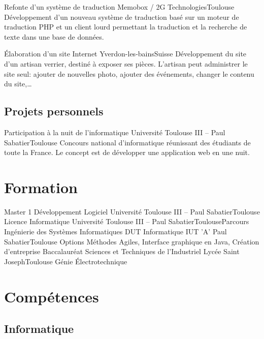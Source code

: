 \documentclass{my_cv_bis}
\begin{document}
	{ Refonte d’un système de traduction }
	{Memobox / 2G Technologies}{Toulouse}
	{Développement d'un nouveau système de traduction basé sur un moteur de traduction PHP et un client lourd
	permettant la traduction et la recherche de texte dans une base de données.  } {}

	{Élaboration d’un site Internet}
	{Yverdon-les-bains}{Suisse}
	{Développement du site d’un artisan verrier, destiné à exposer ses pièces. L'artisan peut administrer le site
	seul: ajouter de nouvelles photo, ajouter des événements, changer le contenu du site,\ldots}
	{}

	\subsection{Projets personnels}
	{Participation à la nuit de l'informatique}
	{Université Toulouse III -- Paul Sabatier}{Toulouse}
	{ Concours national d’informatique réunissant des étudiants de toute la France. Le concept est de développer une application web en une nuit.} 
	{}
	\vspace{-20px}
\section{Formation}
	{Master 1 Développement Logiciel}
	{Université Toulouse III -- Paul Sabatier}{Toulouse}{}{}
	{Licence Informatique}
	{Université Toulouse III -- Paul Sabatier}{Toulouse}{Parcours Ingénierie des Systèmes Informatiques}{}
	{DUT Informatique}
	{IUT 'A' Paul Sabatier}{Toulouse}
	{Options Méthodes Agiles, Interface graphique en Java, Création d'entreprise}
	{}
	{Baccalauréat Sciences et Techniques de l'Industriel}
	{Lycée Saint Joseph}{Toulouse}
	{Génie Électrotechnique}{}
	\vspace{-20px}
\section{Compétences}
		\subsection{Informatique}
		\\
		\\
		\\
		\\
		\\
\end{document}

